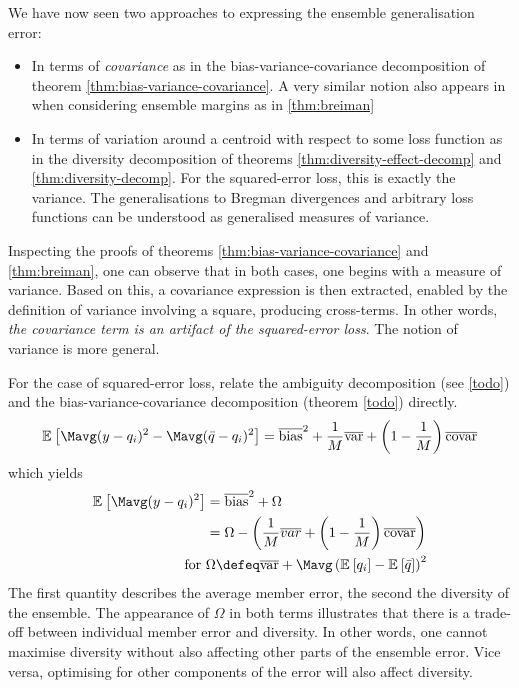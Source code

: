 \documentclass[../main.tex]{subfiles}
\begin{document}
We have now seen two approaches to expressing the ensemble generalisation error:
\begin{itemize}
\item In terms of \textit{covariance} as in the bias-variance-covariance decomposition of theorem \ref{thm:bias-variance-covariance}. A very similar notion also appears in when considering ensemble margins as in \ref{thm:breiman}
\item In terms of variation around a centroid with respect to some loss function as in the diversity decomposition of theorems \ref{thm:diversity-effect-decomp} and \ref{thm:diversity-decomp}. For the squared-error loss, this is exactly the variance. The generalisations to Bregman divergences and arbitrary loss functions can be understood as generalised measures of variance. 
\end{itemize}
Inspecting the proofs of theorems \ref{thm:bias-variance-covariance} and \ref{thm:breiman}, one can observe that in both cases, one begins with a measure of variance. Based on this, a covariance expression is then extracted, enabled by the definition of variance involving a square, producing cross-terms.
In other words, \textit{the covariance term is an artifact of the squared-error loss}. The notion of variance is more general.

For the case of squared-error loss, \cite{brownManaging} relate the ambiguity decomposition (see \ref{todo}) and the bias-variance-covariance decomposition (theorem \ref{todo}) directly. 
\begin{align*}
\mathbb{E}_{}\left[ \Mavg (y - q_{i})^2 - \Mavg (\bar{q} - q_{i})^2 \right]  = \overline{\text{bias} }^2 + \frac{1}{M} \overline{\text{var} } + \left( 1 - \frac{1}{M} \right) \overline{\text{covar} }
\end{align*}
which yields
\begin{align*}
\mathbb{E}_{}\left[ \Mavg (y - q_{i})^2 \right]  &= \overline{\text{bias} }^2 + \Omega \\
&= \Omega - \left( \frac{1}{M}\overline{var} + \left( 1-\frac{1}{M} \right) \overline{\text{covar} } \right) \\
\text{for~}  & \Omega \defeq \overline{\text{var} } + \Mavg \left( \mathbb{E}_{}\left[ q_{i} \right] - \mathbb{E}_{}\left[ \bar{q} \right] \right)^2
\end{align*}
The first quantity describes the average member error, the second the diversity of the ensemble. The appearance of $\Omega$ in both terms illustrates that there is a trade-off between individual member error and diversity. 
In other words, one cannot maximise diversity without also affecting other parts of the ensemble error. Vice versa, optimising for other components of the error will also affect diversity.
\end{document}
